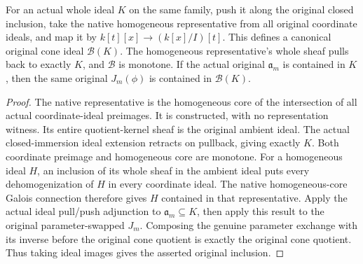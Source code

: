 \begin{lemma}
\label{lem:c0n-canonical-scheme-cone-representative}
\leanok
{}
For an actual whole ideal $K$ on the same family, push it along the original
closed inclusion, take the native homogeneous representative from all original
coordinate ideals, and map it by $k[t][x]\to (k[x]/I)[t]$. This defines a
canonical original cone ideal $\mathcal B(K)$. The homogeneous representative's
whole sheaf pulls back to exactly $K$, and $\mathcal B$ is monotone. If the
actual original $\mathfrak a_m$ is contained in $K$, then the same original
$J_m(\phi)$ is contained in $\mathcal B(K)$.
\end{lemma}
\begin{proof}
The native representative is the homogeneous core of the intersection of all
actual coordinate-ideal preimages. It is constructed, with no representation
witness. Its entire quotient-kernel sheaf is the original ambient ideal. The
actual closed-immersion ideal extension retracts on pullback, giving exactly
$K$. Both coordinate preimage and homogeneous core are monotone. For a
homogeneous ideal $H$, an inclusion of its whole sheaf in the ambient ideal
puts every dehomogenization of $H$ in every coordinate ideal. The native
homogeneous-core Galois connection therefore gives $H$ contained in that
representative. Apply the actual ideal pull/push adjunction to
$\mathfrak a_m\subseteq K$, then apply this result to the original
parameter-swapped $J_m$. Composing the genuine parameter exchange with its
inverse before the original cone quotient is exactly the original cone
quotient. Thus taking ideal images gives the asserted original inclusion.
\end{proof}


